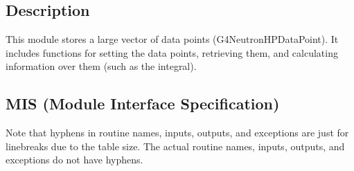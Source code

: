 \documentclass[12pt]{article}
\begin{document}
\subsection{Description}
This module stores a large vector of data points (G4NeutronHPDataPoint). It includes functions for setting the data points, retrieving them, and calculating information over them (such as the integral).

\subsection{MIS (Module Interface Specification)}
Note that hyphens in routine names, inputs, outputs, and exceptions are just for linebreaks due to the table size. The actual routine names, inputs, outputs, and exceptions do not have hyphens.
\end{document}
